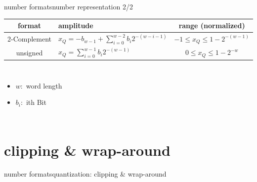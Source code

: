 	\begin{frame}{number formats}{number representation 2/2}
		\begin{table}
			\centering
			\begin{footnotesize}
				\begin{tabular}{clc}
				\hline
				\textbf{format} & \textbf{amplitude} & \textbf{range (normalized)}\\
				\hline
				2-Complement & $x_Q = -b_{w-1} + \sum\limits_{i=0}^{w-2}b_{i}2^{-(w-i-1)}$ & $-1\leq x_Q \leq 1-2^{-(w-1)}$\\
				unsigned & $x_Q = \sum\limits_{i=0}^{w-1}b_i2^{-(w-1)}$ & $0\leq x_Q \leq 1-2^{-w}$\\
				\hline
				\end{tabular}
			\end{footnotesize}
		\end{table}
        \vspace{-3mm}
        \begin{columns}
		\begin{itemize}
			\item	$w:$ word length
			\item	$b_i:$ ith Bit
		\end{itemize}
        \end{columns}
	\end{frame}
	
\section[clipping]{clipping \& wrap-around}
	\begin{frame}{number formats}{quantization: clipping \& wrap-around}
        \begin{columns}
	    \vspace{-5mm}
            
            \bigskip
            \bigskip
            \bigskip
            \smallskip
             
            \bigskip
            \bigskip
            \smallskip
            
        \end{columns}
	\end{frame}	
	
